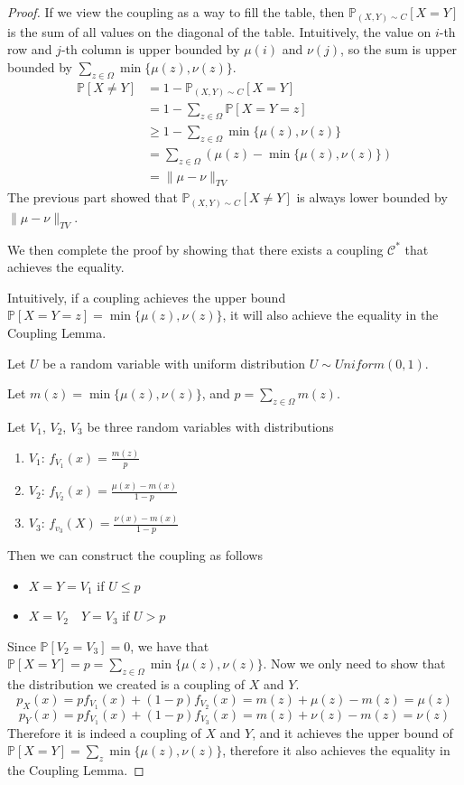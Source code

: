         \begin{proof}
            If we view the coupling as a way to fill the table, then $\mathbb{P}_{(X,Y) \sim C}[X=Y]$ is the sum of all values on the diagonal of the table. Intuitively, the value on $i$-th row and $j$-th column is upper bounded by $\mu(i)$ and $\nu(j)$, so the sum is upper bounded by $\sum_{z\in\Omega}\min\{\mu(z), \nu(z)\}$.
            \begin{align*}
                \mathbb{P}[X \neq Y] &= 1 - \mathbb{P}_{(X,Y) \sim C}[X = Y] \\
                &= 1 - \sum_{z \in \Omega}\mathbb{P}[X=Y=z] \\
                &\ge 1 - \sum_{z \in \Omega}\min \{\mu(z), \nu(z)\}\\
                &= \sum_{z \in \Omega}\left( \mu(z) - \min\{\mu(z),\nu(z)\} \right)\\
                &= \| \mu - \nu \|_{TV}
            \end{align*}
            The previous part showed that $\mathbb{P}_{(X,Y)\sim C}[X \neq Y]$ is always lower bounded by $\|\mu - \nu\|_{TV}$.

            We then complete the proof by showing that there exists a coupling $\mathcal{C}^*$ that achieves the equality.

            Intuitively, if a coupling achieves the upper bound $\mathbb{P}[X = Y = z] = \min\{ \mu(z), \nu(z) \}$, it will also achieve the equality in the Coupling Lemma.

            Let $U$ be a random variable with uniform distribution $U \sim Uniform(0,1)$.

            Let $m(z) = \min\{\mu(z), \nu(z)\}$, and $p = \sum_{z\in\Omega}m(z)$.

            Let $V_1$, $V_2$, $V_3$ be three random variables with distributions
            \begin{enumerate}
                \item $V_1$: $f_{V_1}(x) = \frac{m(z)}{p}$
                \item $V_2$: $f_{V_2}(x) = \frac{\mu(x) - m(x)}{1-p}$
                \item $V_3$: $f_{v_3}(X) = \frac{\nu(x) - m(x)}{1-p}$
            \end{enumerate}
            Then we can construct the coupling as follows
            \begin{itemize}
                \item $X=Y=V_1$ if $U \le p$
                \item $X=V_2 \quad Y=V_3$ if $U > p$
            \end{itemize}
            Since $\mathbb{P}[V_2 = V_3] = 0$, we have that $\mathbb{P}[X = Y] = p = \sum_{z\in\Omega}\min\{\mu(z), \nu(z)\}$. Now we only need to show that the distribution we created is a coupling of $X$ and $Y$.
            \[ p_X(x) = pf_{V_1}(x) + (1-p)f_{V_2}(x) = m(z) + \mu(z) - m(z) = \mu(z) \]
            \[ p_Y(x) = pf_{V_1}(x) + (1-p)f_{V_3}(x) = m(z) + \nu(z) - m(z) = \nu(z) \]
            Therefore it is indeed a coupling of $X$ and $Y$, and it achieves the upper bound of $\mathbb{P}[X=Y] = \sum_z\min\{\mu(z),\nu(z)\}$, therefore it also achieves the equality in the Coupling Lemma.
        \end{proof}
